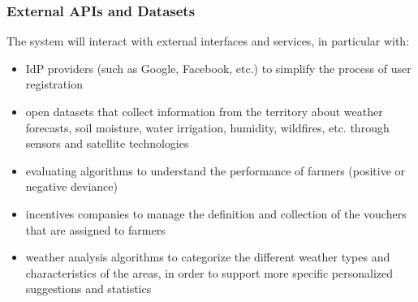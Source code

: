 \subsubsection{External APIs and Datasets}
The system will interact with external interfaces and services, in particular with:
\begin{itemize}
    \item IdP providers (such as Google, Facebook, etc.) to simplify the process of user registration
    \item open datasets that collect information from the territory about weather forecasts, soil moisture, water irrigation, humidity, wildfires, etc. through sensors and satellite technologies
    \item evaluating algorithms to understand the performance of farmers (positive or negative deviance)
    \item incentives companies to manage the definition and collection of the vouchers that are assigned to farmers
    \item weather analysis algorithms to categorize the different weather types and characteristics of the areas, in order to support more specific personalized suggestions and statistics
\end{itemize}